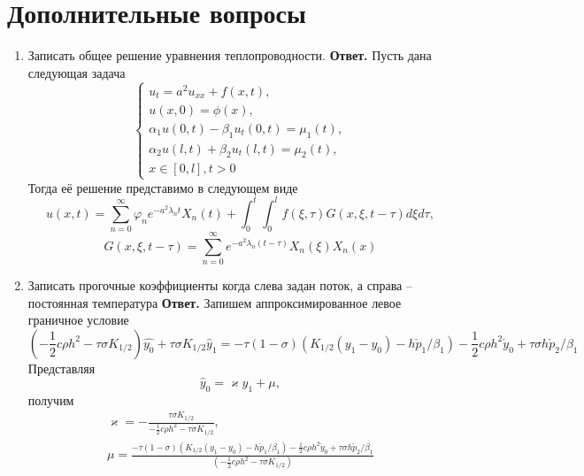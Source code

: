 \documentclass{article}
\begin{document}
\section{Дополнительные вопросы}
\begin{enumerate}
	\item Записать общее решение уравнения теплопроводности.
	\newline
	{\bfseries Ответ. } 
	Пусть дана следующая задача
	\begin{equation*}
		\begin{cases}
			u_t = a^2 u_{xx} + f(x, t), \\ 
			u(x, 0) = \phi(x), \\
			\alpha_1 u(0, t) - \beta_1 u_t(0, t) = \mu_1(t), \\ 
			\alpha_2 u(l, t) + \beta_2 u_t(l, t) = \mu_2(t), \\ 
			x  \in [0, l], t >0
		\end{cases}
	\end{equation*}
	Тогда её решение представимо в следующем виде 
	\begin{equation*}
		u(x, t) =  \sum_{n = 0}^{\infty} \varphi_n e^{-a^2 \lambda_n t}X_n(t) + 
		\int_{0}^{t} \int_{0}^{l} f(\xi, \tau) G(x, \xi, t - \tau) d\xi d\tau,
	\end{equation*}
	\begin{equation*}
		G(x, \xi, t - \tau) = \sum_{n=0}^{\infty} e^{-a^2 \lambda_n (t - \tau)} X_n(\xi) X_n(x)
	\end{equation*}
	\item Записать прогочные коэффициенты когда слева задан поток, а справа -- постоянная температура
	\newline 
	{\bfseries Ответ. } 
	Запишем аппроксимированное левое граничное условие
	\begin{equation*}
		(-\frac{1}{2} c \rho h^2 - \tau  \sigma K_{1/2}) \hat{y_0} + \tau \sigma K_{1/2}  \hat{y}_1 = 
		-\tau (1-\sigma ) ( K_{1/2} (y_1 - y_0) - h \check{p}_1 / \beta_1) - \frac{1}{2}  c  \rho  h^2 \check{y}_0 + \tau  \sigma  h  \check{p}_2/ \beta_1
	\end{equation*}
	Представляя
	\begin{equation*}
		\hat{y}_0 = \varkappa \hat{y}_1 + \mu,
 	\end{equation*}
	получим 
	\begin{gather*}
		\varkappa = - \frac{\tau \sigma K_{1/2}}{-\frac{1}{2} c \rho h^2 - \tau  \sigma K_{1/2}}, \\
		\mu = \frac{-\tau (1-\sigma ) ( K_{1/2} (y_1 - y_0) - h \check{p}_1 / \beta_1) - \frac{1}{2}  c  \rho  h^2 \check{y}_0 + \tau  \sigma  h  \check{p}_2/ \beta_1}{(-\frac{1}{2} c \rho h^2 - \tau  \sigma K_{1/2})}

\end{gather*}
\end{enumerate}
\end{document}
